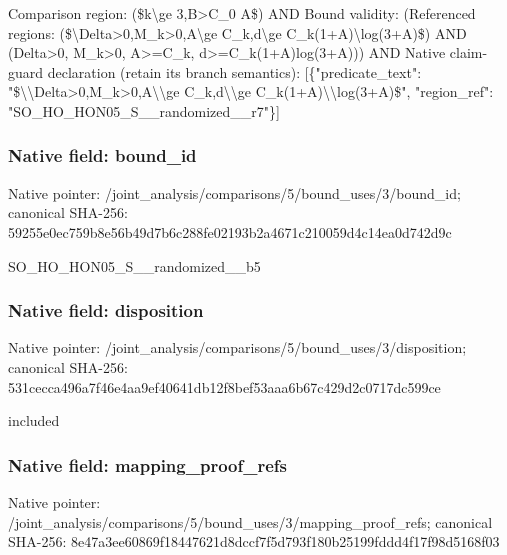 \documentclass[10pt,a4paper]{article}
\begin{document}
\begingroup\raggedright\sloppy Comparison region:\allowbreak{} (\$k\textbackslash{}ge 3,\allowbreak{}B>C\_\allowbreak{}0 A\$) AND Bound validity:\allowbreak{} (Referenced regions:\allowbreak{} (\$\textbackslash{}Delta>0,\allowbreak{}M\_\allowbreak{}k>0,\allowbreak{}A\textbackslash{}ge C\_\allowbreak{}k,\allowbreak{}d\textbackslash{}ge C\_\allowbreak{}k(1+A)\textbackslash{}log(3+A)\$) AND (Delta>0,\allowbreak{} M\_\allowbreak{}k>0,\allowbreak{} A>=\allowbreak{}C\_\allowbreak{}k,\allowbreak{} d>=\allowbreak{}C\_\allowbreak{}k(1+A)log(3+A))) AND Native claim-guard declaration (retain its branch semantics):\allowbreak{} [\{"predicate\_\allowbreak{}text":\allowbreak{} "\$\textbackslash{}\textbackslash{}Delta>0,\allowbreak{}M\_\allowbreak{}k>0,\allowbreak{}A\textbackslash{}\textbackslash{}ge C\_\allowbreak{}k,\allowbreak{}d\textbackslash{}\textbackslash{}ge C\_\allowbreak{}k(1+A)\textbackslash{}\textbackslash{}log(3+A)\$",\allowbreak{} "region\_\allowbreak{}ref":\allowbreak{} "SO\_\allowbreak{}HO\_\allowbreak{}HON05\_\allowbreak{}S\_\allowbreak{}\_\allowbreak{}randomized\_\allowbreak{}\_\allowbreak{}r7"\}]\par\endgroup

\subsubsection{Native field: bound\_\allowbreak{}id}
Native pointer: /joint\_\allowbreak{}analysis/comparisons/5/bound\_\allowbreak{}uses/3/bound\_\allowbreak{}id; canonical SHA-256: 59255e0ec759b8e56b49d7b6c288fe02193b2a4671c210059d4c14ea0d742d9c

\begingroup\raggedright\sloppy SO\_\allowbreak{}HO\_\allowbreak{}HON05\_\allowbreak{}S\_\allowbreak{}\_\allowbreak{}randomized\_\allowbreak{}\_\allowbreak{}b5\par\endgroup

\subsubsection{Native field: disposition}
Native pointer: /joint\_\allowbreak{}analysis/comparisons/5/bound\_\allowbreak{}uses/3/disposition; canonical SHA-256: 531cecca496a7f46e4aa9ef40641db12f8bef53aaa6b67c429d2c0717dc599ce

\begingroup\raggedright\sloppy included\par\endgroup

\subsubsection{Native field: mapping\_\allowbreak{}proof\_\allowbreak{}refs}
Native pointer: /joint\_\allowbreak{}analysis/comparisons/5/bound\_\allowbreak{}uses/3/mapping\_\allowbreak{}proof\_\allowbreak{}refs; canonical SHA-256: 8e47a3ee60869f18447621d8dccf7f5d793f180b25199fddd4f17f98d5168f03
\end{document}
